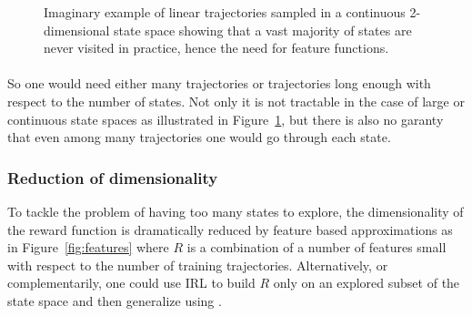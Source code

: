 \documentclass{article}
\begin{document}
\begin{figure}
\begin{center}
\end{center}
\caption{Imaginary example of linear trajectories sampled in a continuous 2-dimensional state space showing that a vast majority of states are never visited in practice, hence the need for feature functions. \label{fig:continuous-grid}}
\end{figure}


\paragraph{}
So one would need either many trajectories or trajectories long enough with respect to the number of states. Not only it is not tractable in the case of large or continuous state spaces as illustrated in Figure~\ref{fig:continuous-grid}, but there is also no garanty that even among many trajectories one would go through each state.

\subsubsection{Reduction of dimensionality}
To tackle the problem of having too many states to explore, the dimensionality of the reward function is dramatically reduced by feature based approximations \cite{Abbeel04, Levine11} as in Figure~\ref{fig:features} where $R$ is a combination of a number of features small with respect to the number of training trajectories. Alternatively, or complementarily, one could use IRL to build $R$ only on an explored subset of the state space and then generalize using \cite{Finn17}.
\end{document}
